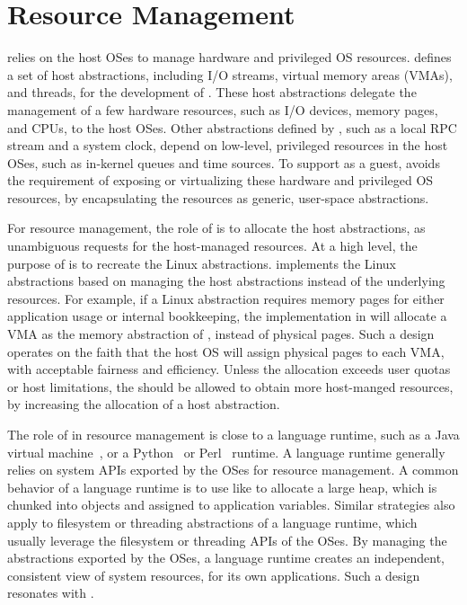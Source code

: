 \section{Resource Management}
\label{sec:libos:resource}


\Thelibos{}
relies on the host OSes to manage hardware and privileged OS resources.
\Thehostabi{}
defines a set of host abstractions,
including I/O streams, virtual memory areas (VMAs), and threads,
for the development of \libos{}.
These host abstractions delegate
the management of a few hardware resources, such as I/O devices, memory pages, and CPUs,
to the host OSes.
Other abstractions defined
by \thehostabi{},
such as a local RPC stream and a system clock,
depend on low-level, privileged resources in the host OSes,
such as in-kernel queues and time sources.
To support \thelibos{} as a guest,
\thehostabi{} avoids the requirement of exposing or virtualizing %
these hardware and privileged OS resources,
by encapsulating the resources as generic, user-space abstractions.



For resource management, the role of \thelibos{}
is to allocate the host abstractions,
as unambiguous requests %
for the host-managed resources.
At a high level, the purpose of \thelibos{} is to recreate the Linux abstractions.
\Thelibos{} implements the Linux abstractions
based on managing the host abstractions instead of
the underlying resources.
For example, if a Linux abstraction requires memory pages
for either application usage or
internal bookkeeping,
the implementation in
\thelibos{} will allocate a VMA as the memory abstraction of \thehostabi{}, instead of physical pages.
Such a \libos{} design operates on the faith that the host OS will assign physical pages to each VMA, with acceptable fairness and efficiency.
Unless the allocation exceeds user quotas or host limitations,
the \libos{} should be allowed to obtain more host-manged resources,
by increasing the allocation of a host abstraction.



The role of \thelibos{} in resource management is close to a language runtime, such as a Java virtual machine~\cite{hotspot,j9,alpern2000jalapeno}, or a Python~\cite{python} or Perl~\cite{perl} runtime.
A language runtime generally relies on system APIs exported by the OSes
for resource management.
A common behavior of a language runtime
is to use \linuxapis{} like  to allocate a large heap,
which is chunked into objects
and assigned to application variables.
Similar strategies also apply to
filesystem or threading abstractions of a language runtime, which %
usually leverage the filesystem or threading APIs of the OSes.
By managing the abstractions
exported by the OSes,
a language runtime creates an independent, consistent view
of system resources, for its own applications.
Such a design resonates with \thelibos{}. 





